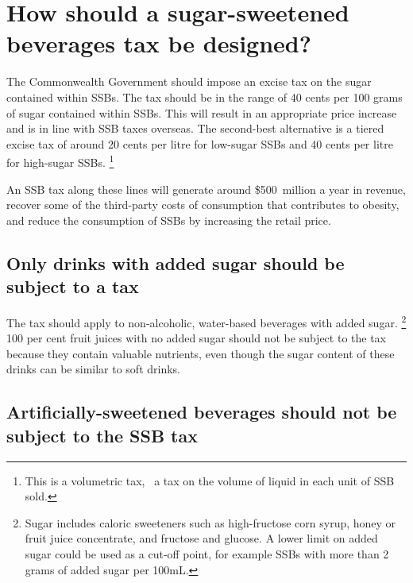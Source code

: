 \documentclass[embargoed]{grattan}
\begin{document}
\chapter{How should a sugar-sweetened beverages tax be designed?}\label{how-should-a-sugar-sweetened-beverages-tax-be-designed}

The Commonwealth Government should impose an excise tax on the sugar contained within SSBs.
The tax should be in the range of 40 cents per 100 grams of sugar contained within SSBs.
This will result in an appropriate price increase and is in line with SSB taxes overseas.
The second-best alternative is a tiered excise tax of around 20 cents per litre for low-sugar SSBs and 40 cents per litre for high-sugar SSBs.%
\footnote{This is a volumetric tax, \ie~a tax on the volume of liquid in each unit of SSB sold.}

An SSB tax along these lines will generate around \$500~million a year in revenue, recover some of the third-party costs of consumption that contributes to obesity, and reduce the consumption of SSBs by increasing the retail price.

\section{Only drinks with added sugar should be subject to a tax}\label{only-drinks-with-added-sugar-should-be-subject-to-a-tax}

The tax should apply to non-alcoholic, water-based beverages with added sugar.%
\footnote{Sugar includes caloric sweeteners such as high-fructose corn syrup, honey or fruit juice concentrate, and fructose and glucose.
A lower limit on added sugar could be used as a cut-off point, for example SSBs with more than 2 grams of added sugar per 100mL.} 100 per cent fruit juices with no added sugar should not be subject to the tax because they contain valuable nutrients, even though the sugar content of these drinks can be similar to soft drinks.

\section{Artificially-sweetened beverages should not be subject to the SSB tax}\label{artificially-sweetened-beverages-should-not-be-subject-to-the-ssb-tax}
\end{document}
